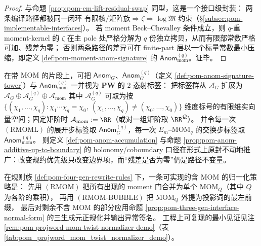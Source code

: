 \begin{proof}
与命题 \ref{prop:pom-em-lift-residual-swap} 同型，这是一个接口级封装：
两条编译路径都被同一闭环
\(
\text{有限核/矩阵族}\Rightarrow \zeta\Rightarrow \log\mathfrak{M}
\)
约束（\S\ref{subsec:pom-implementable-interfaces}）。
若 moment Beck--Chevalley 条件成立，则 \(q\)-重 moment-kernel 的 \(\zeta\) 在主 pole 处严格分解为 \(q\) 份独立拷贝，从而有限部常数严格可加、残差为零；
否则两条路径的差异可在 finite-part 层以一个标量常数最小压缩，即定义 \ref{def:pom-moment-anom-signature} 的 \(\mathsf{Anom}^{(q)}_{\mathrm{mom}}\)。证毕。
\end{proof}

\begin{remark}\label{rem:pom-anom-cohomology-mom}
在带 \(\mathrm{MOM}\) 的片段上，可把 \(\mathsf{Anom}_G\)、\(\mathsf{Anom}^{(q)}_{G}\)（定义 \ref{def:pom-anom-signature-tower}）与 \(\mathsf{Anom}^{(q)}_{\mathrm{mom}}\) 一并视为 \(\mathbf{PW}\) 的 \(2\)-态射标签：
把标签群从 \(\mathcal{A}_G\) 扩展为
\(
\mathcal{A}_G\oplus\mathcal{A}^{(q)}_{G}\oplus\mathcal{A}_{\mathrm{mom}}
\)
其中 \(\mathcal{A}^{(q)}_{G}\) 可取为按 \(\{(\chi_1,\dots,\chi_q):\chi_1\cdots\chi_q=\chi_0,\ (\chi_1,\dots,\chi_q)\neq(\chi_0,\dots,\chi_0)\}\) 维度标号的有限维实向量空间；固定矩阶时 \(\mathcal{A}_{\mathrm{mom}}:=\RR\)（或对一组矩阶取 \(\RR^{\mathcal{Q}}\)）。
并令每一次 \((\mathrm{RMOML})\) 的展开步标签取 \(\mathsf{Anom}^{(q)}_{G}\)，每一次 \(E_m\)--\(\mathrm{MOM}_q\) 的交换步标签取 \(\mathsf{Anom}^{(q)}_{\mathrm{mom}}\)。
则定义 \ref{def:pom-anom-accumulation} 与命题 \ref{prop:pom-anom-additive-up-to-boundary} 的 holonomy/coboundary 口径在形式上原封不动地推广：改变规约优先级只改变边界项，而“残差是否为零”仍是路径不变量。
\end{remark}

\begin{remark}\label{rem:pom-mom-normalize-strategy}
在规则族 \ref{def:pom-four-gen-rewrite-rules} 下，一条可实现的含 \(\mathrm{MOM}\) 的归一化策略是：
先用 \((\mathrm{RMOM})\) 把所有出现的 moment 门合并为单个 \(\mathrm{MOM}_Q\)（其中 \(Q\) 为各阶的乘积），
再用 \((\mathrm{RMOM\text{-}BUBBLE})\) 把 \(\mathrm{MOM}_Q\) 外提为投影词的最左前缀，
最后对剩余不含 \(\mathrm{MOM}\) 的部分应用命题 \ref{prop:pom-three-gen-interface-normal-form} 的三生成元正规化并输出异常签名。
工程上可复现的最小见证见注 \ref{rem:pom-projword-mom-twist-normalizer-demo}（表 \ref{tab:pom_projword_mom_twist_normalizer_demo}）。
\end{remark}

